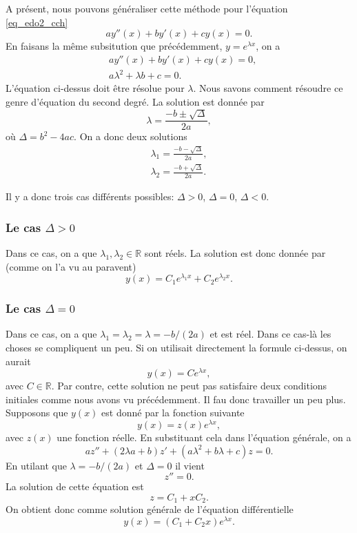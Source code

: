 \documentclass[a4paper,12pt]{book}
\newcommand{\real}{\mathbb{R}}
\renewcommand{\eqref}[1]{\ref{#1}}
\begin{document}
A présent, nous pouvons généraliser cette méthode pour l'équation \eqref{eq_edo2_cch}
\begin{equation}
 a y''(x)+by'(x)+cy(x)=0.
\end{equation}
En faisans la même subsitution que précédemment, $y=e^{\lambda x}$, on a
\begin{align}
 &a y''(x)+by'(x)+cy(x)=0,\\
 &a \lambda^2+\lambda b+c=0.
\end{align}
L'équation ci-dessus doit être résolue pour $\lambda$. Nous savons comment résoudre 
ce genre d'équation du second degré. La solution est donnée par
\begin{equation}
 \lambda=\frac{-b\pm\sqrt{\Delta}}{2a},
\end{equation}
où $\Delta = b^2-4ac$. On a donc deux solutions
\begin{align}
 \lambda_1=\frac{-b-\sqrt{\Delta}}{2a},\\
 \lambda_2=\frac{-b+\sqrt{\Delta}}{2a}.
\end{align}

Il y a donc trois cas différents possibles: $\Delta > 0$, $\Delta = 0$, $\Delta < 0$.
\subsubsection{Le cas $\Delta>0$}
Dans ce cas, on a que $\lambda_1,\lambda_2\in\real$ sont réels. 
La solution est donc donnée par (comme on l'a vu au paravent)
\begin{equation}
y(x)=C_1e^{\lambda_1 x}+C_2e^{\lambda_2 x}.
\end{equation} 
\subsubsection{Le cas $\Delta=0$}
Dans ce cas, on a que $\lambda_1=\lambda_2=\lambda=-b/(2a)$ et est réel. Dans ce cas-là
les choses se compliquent un peu. Si on utilisait directement la formule ci-dessus,
on aurait
\begin{equation*}
y(x)=Ce^{\lambda x},
\end{equation*} 
avec $C\in\real$. Par contre, cette solution ne peut pas satisfaire 
deux conditions initiales comme nous avons vu précédemment. Il fau donc 
travailler un peu plus. Supposons que $y(x)$ est donné par la fonction suivante
\begin{equation}
y(x)=z(x)e^{\lambda x},
\end{equation} 
avec $z(x)$ une fonction réelle. En substituant cela dans l'équation générale, on a
\begin{equation}
az''+(2\lambda a+b)z'+(a\lambda^2+b\lambda+c)z=0.
\end{equation} 
En utilant que $\lambda=-b/(2a)$ et $\Delta =0$ il vient
\begin{equation}
z''=0.
\end{equation} 
La solution de cette équation est
\begin{equation}
z=C_1+xC_2.
\end{equation} 
On obtient donc comme solution générale de l'équation différentielle
\begin{equation}
y(x)=(C_1+C_2 x)e^{\lambda x}.
\end{equation} 
\end{document}
